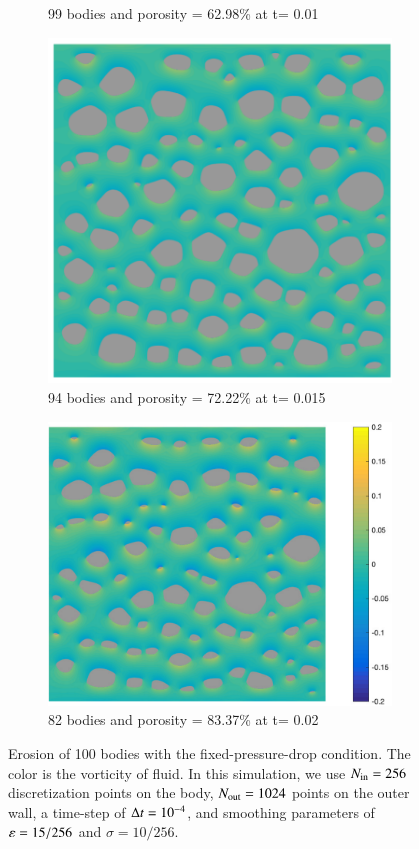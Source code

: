 \documentclass[preprint, 10pt]{elsarticle}
\begin{document}
\begin{figure}[H]
\begin{subfigure}[b]{0.5\textwidth}
\caption{99 bodies and porosity = 62.98\% at t= 0.01}
\end{subfigure}
\begin{subfigure}[b]{0.5\textwidth}
\includegraphics*[width =0.9\linewidth]{./figs/100b_150}
\caption{94 bodies and porosity = 72.22\% at t= 0.015}
\end{subfigure}%
\begin{subfigure}[b]{0.5\textwidth}
\includegraphics*[width =1.1\linewidth]{./figs/100b_200}
\caption{82 bodies and porosity = 83.37\% at t= 0.02}
\end{subfigure}
\caption{\label{fig:Eroding100vort} Erosion of 100 bodies with the
  fixed-pressure-drop condition. The color is the vorticity of fluid. In
  this simulation, we use $N_{\mathrm{in}} = 256$ discretization points on the
  body, $N_{\mathrm{out}} = 1024$ points on the outer wall, a time-step of
  $\Delta t=10^{-4}$, and smoothing parameters of $\varepsilon= 15/256$ and
  $\sigma=10/256$.}
\end{figure}
\end{document}
